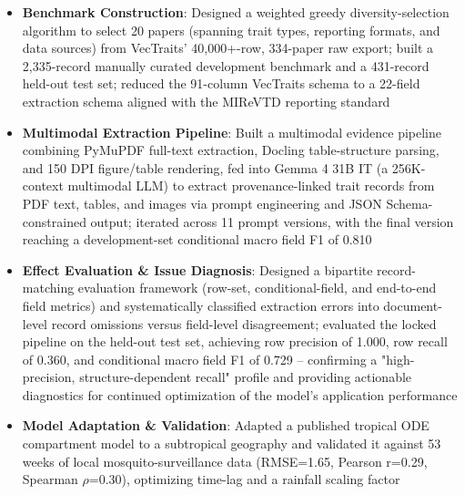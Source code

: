\documentclass{my-resume}
\begin{document}
\begin{itemize}[parsep=0.2ex]
  \item \textbf{Benchmark Construction}: Designed a weighted greedy diversity-selection algorithm to select 20 papers (spanning trait types, reporting formats, and data sources) from VecTraits' 40,000+-row, 334-paper raw export; built a 2,335-record manually curated development benchmark and a 431-record held-out test set; reduced the 91-column VecTraits schema to a 22-field extraction schema aligned with the MIReVTD reporting standard
  \item \textbf{Multimodal Extraction Pipeline}: Built a multimodal evidence pipeline combining PyMuPDF full-text extraction, Docling table-structure parsing, and 150 DPI figure/table rendering, fed into Gemma 4 31B IT (a 256K-context multimodal LLM) to extract provenance-linked trait records from PDF text, tables, and images via prompt engineering and JSON Schema-constrained output; iterated across 11 prompt versions, with the final version reaching a development-set conditional macro field F1 of 0.810
  \item \textbf{Effect Evaluation \& Issue Diagnosis}: Designed a bipartite record-matching evaluation framework (row-set, conditional-field, and end-to-end field metrics) and systematically classified extraction errors into document-level record omissions versus field-level disagreement; evaluated the locked pipeline on the held-out test set, achieving row precision of 1.000, row recall of 0.360, and conditional macro field F1 of 0.729 -- confirming a "high-precision, structure-dependent recall" profile and providing actionable diagnostics for continued optimization of the model's application performance
\end{itemize}

\begin{itemize}[parsep=0.2ex]
  \item \textbf{Model Adaptation \& Validation}: Adapted a published tropical ODE compartment model to a subtropical geography and validated it against 53 weeks of local mosquito-surveillance data (RMSE=1.65, Pearson r=0.29, Spearman $\rho$=0.30), optimizing time-lag and a rainfall scaling factor
\end{itemize}
\end{document}
